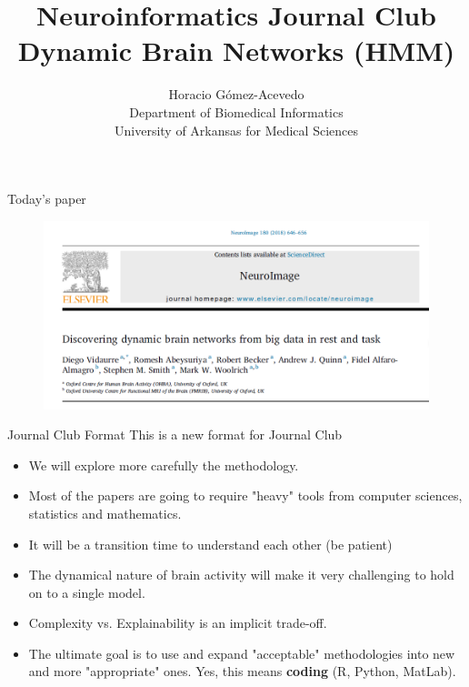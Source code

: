 \documentclass{beamer}
\title{Neuroinformatics Journal Club\\ Dynamic Brain Networks (HMM)}
\author{Horacio G\'omez-Acevedo\\ Department of Biomedical Informatics\\
	University of Arkansas for Medical Sciences}
\begin{document}
	\begin{frame}[plain]
		\maketitle
	\end{frame}
	
\begin{frame}{Today's paper}
	\begin{figure}[h]
	\centering
		\includegraphics[scale=0.6]{../Figures/vidaurre_paper.png}
	\end{figure}
\end{frame}

\begin{frame}{Journal Club Format}
	This is a new format for Journal Club
	\begin{itemize}
		\item We will explore more carefully the methodology.
		\item Most of the papers are going to require "heavy" tools from computer sciences, statistics and mathematics. 
		\item It will be a transition time to understand each other (be patient)
		\item The dynamical nature of brain activity will make it very challenging to hold on to a single model. 
		\item Complexity vs. Explainability is an implicit trade-off. 
		\item The ultimate goal is to use and expand "acceptable" methodologies into new and more "appropriate" ones. Yes, this means \textbf{coding} (R, Python, MatLab).
	\end{itemize} 
\end{frame}
\end{document}
